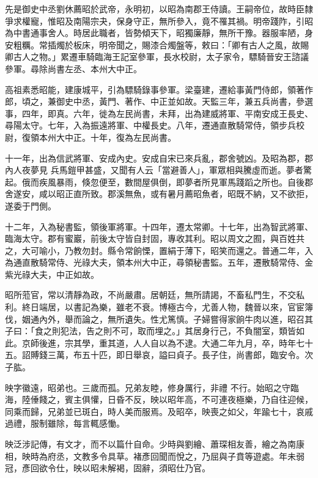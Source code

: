 \begin{pinyinscope}
 先是御史中丞劉休薦昭於武帝，永明初，以昭為南郡王侍讀。王嗣帝位，故時臣隸爭求權寵，惟昭及南陽宗夬，保身守正，無所參入，竟不罹其禍。明帝踐阼，引昭為中書通事舍人。時居此職者，皆勢傾天下，昭獨廉靜，無所干豫。器服率陋，身安粗糲。常插燭於板床，明帝聞之，賜漆合燭盤等，敕曰：「卿有古人之風，故賜
 卿古人之物。」累遷車騎臨海王記室參軍，長水校尉，太子家令，驃騎晉安王諮議參軍。尋除尚書左丞、本州大中正。



 高祖素悉昭能，建康城平，引為驃騎錄事參軍。梁臺建，遷給事黃門侍郎，領著作郎，頃之，兼御史中丞，黃門、著作、中正並如故。天監三年，兼五兵尚書，參選事，四年，即真。六年，徙為左民尚書，未拜，出為建威將軍、平南安成王長史、尋陽太守。七年，入為振遠將軍、中權長史。八年，遷通直散騎常侍，領步兵校尉，復領本州大中正。十年，復為左民尚書。



 十一年，出為信武將軍、安成內史。安成自宋已來兵亂，郡舍號凶。及昭為郡，郡內人夜夢見
 兵馬鎧甲甚盛，又聞有人云「當避善人」，軍眾相與騰虛而逝。夢者驚起。俄而疾風暴雨，倏忽便至，數間屋俱倒，即夢者所見軍馬踐蹈之所也。自後郡舍遂安，咸以昭正直所致。郡溪無魚，或有暑月薦昭魚者，昭既不納，又不欲拒，遂委于門側。



 十二年，入為秘書監，領後軍將軍。十四年，遷太常卿。十七年，出為智武將軍、臨海太守。郡有蜜巖，前後太守皆自封固，專收其利。昭以周文之囿，與百姓共之，大可喻小，乃教勿封。縣令常餉慄，置絹于薄下，昭笑而還之。普通二年，入為通直散騎常侍、光祿大夫，領本州大中正，尋領秘書監。五年，遷散騎常侍、金
 紫光祿大夫，中正如故。



 昭所蒞官，常以清靜為政，不尚嚴肅。居朝廷，無所請謁，不畜私門生，不交私利。終日端居，以書記為樂，雖老不衰。博極古今，尤善人物，魏晉以來，官宦簿伐，姻通內外，舉而論之，無所遺失。性尤篤慎。子婦嘗得家餉牛肉以進，昭召其子曰：「食之則犯法，告之則不可，取而埋之。」其居身行己，不負闇室，類皆如此。京師後進，宗其學，重其道，人人自以為不逮。大通二年九月，卒，時年七十五。詔賻錢三萬，布五十匹，即日舉哀，謚曰貞子。長子住，尚書郎，臨安令。次子肱。



 映字徽遠，昭弟也。三歲而孤。兄弟友睦，修身厲行，非禮
 不行。始昭之守臨海，陸倕餞之，賓主俱懽，日昏不反，映以昭年高，不可連夜極樂，乃自往迎候，同乘而歸，兄弟並已斑白，時人美而服焉。及昭卒，映喪之如父，年踰七十，哀戚過禮，服制雖除，每言輒感慟。



 映泛涉記傳，有文才，而不以篇什自命。少時與劉繪、蕭琛相友善，繪之為南康相，映時為府丞，文教多令具草。褚彥回聞而悅之，乃屈與子賁等遊處。年未弱冠，彥回欲令仕，映以昭未解褐，固辭，須昭仕乃官。




\end{pinyinscope}
